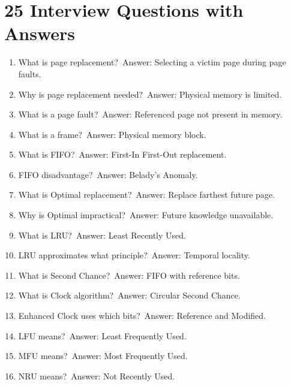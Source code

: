 \section{25 Interview Questions with Answers}

\begin{enumerate}
\item What is page replacement?\
Answer: Selecting a victim page during page faults.

\item Why is page replacement needed?\
Answer: Physical memory is limited.

\item What is a page fault?\
Answer: Referenced page not present in memory.

\item What is a frame?\
Answer: Physical memory block.

\item What is FIFO?\
Answer: First-In First-Out replacement.

\item FIFO disadvantage?\
Answer: Belady's Anomaly.

\item What is Optimal replacement?\
Answer: Replace farthest future page.

\item Why is Optimal impractical?\
Answer: Future knowledge unavailable.

\item What is LRU?\
Answer: Least Recently Used.

\item LRU approximates what principle?\
Answer: Temporal locality.

\item What is Second Chance?\
Answer: FIFO with reference bits.

\item What is Clock algorithm?\
Answer: Circular Second Chance.

\item Enhanced Clock uses which bits?\
Answer: Reference and Modified.

\item LFU means?\
Answer: Least Frequently Used.

\item MFU means?\
Answer: Most Frequently Used.

\item NRU means?\
Answer: Not Recently Used.


\end{enumerate}
